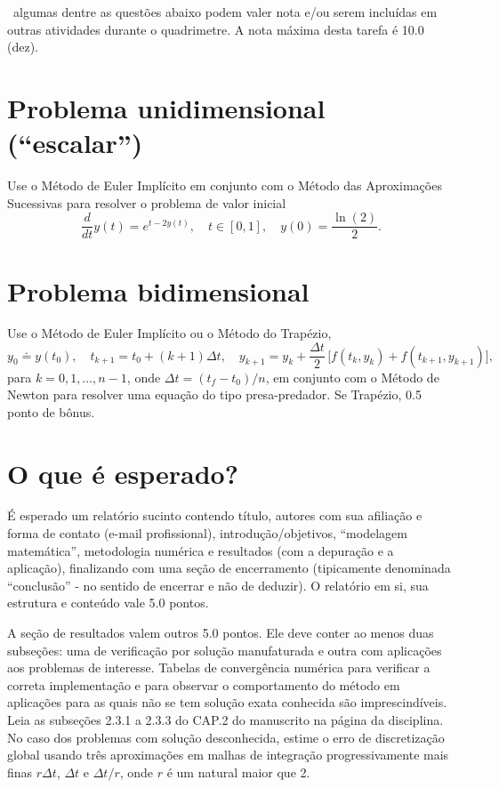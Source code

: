 \documentclass{article}
\begin{document}
\vspace{2mm}
\, algumas dentre as questões abaixo podem valer nota e/ou serem incluídas em outras atividades durante o quadrimetre. A nota máxima desta tarefa é 10.0 (dez).

\mbox{}
\vspace{5mm}



\section{Problema unidimensional (``escalar'')}

Use o Método de Euler Implícito em conjunto com o Método das Aproximações Sucessivas para resolver o problema de valor inicial
\[\frac{d}{dt}{y}(t)=e^{t-2y(t)},\quad t\in [0,1],\quad y(0)=\frac{\ln(2)}{2}.\]

\section{Problema bidimensional}
Use o Método de Euler Implícito ou o Método do Trapézio, 
\[ y_0\doteq y(t_0),\quad t_{k+1}=t_0+(k+1)\Delta t,\quad y_{k+1}=y_k+\frac{\Delta t}{2}\,\Big[f(t_k,y_k)+f(t_{k+1},y_{k+1})\Big], 
\] 
para $k=0,1,\ldots , n-1$, onde $\Delta t=(t_f-t_0)/n$,
em conjunto com o Método de Newton para resolver uma equação do tipo presa-predador. Se Trapézio, 0.5 ponto de bônus.

\section{O que é esperado?}
É esperado um relatório sucinto contendo título, autores com sua afiliação e forma de contato (e-mail profissional), introdução/objetivos, ``modelagem mate\-mática'', metodologia numérica e resultados (com a depuração e a aplicação), finalizando com uma seção de encerramento (tipicamente denominada ``conclusão'' -  no sentido de encerrar e não de deduzir). O relatório em si, sua estrutura e conteúdo vale 5.0 pontos. 

A seção de resultados valem outros 5.0 pontos. Ele deve conter ao menos duas subseções: uma de verificação por solução manufaturada e outra com aplicações aos problemas de interesse. Tabelas de convergência numérica para verificar a correta implementação e para observar o comportamento do método em aplicações para as quais não se tem solução exata conhecida são imprescindíveis. Leia as subseções 2.3.1 a 2.3.3 do CAP.2 do manuscrito na página da disciplina. No caso dos problemas com solução desconhecida, estime o erro de discretização global usando três aproximações em malhas de integração progressivamente mais finas $r\Delta t$, $\Delta t$ e $\Delta t/r$, onde $r$ é um natural maior que 2.
\end{document}

